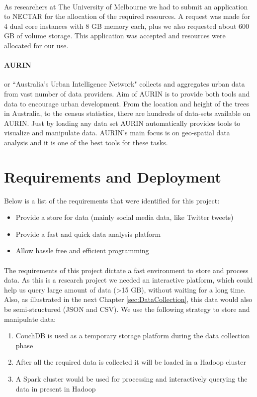 \documentclass[12pt]{report}
\theoremstyle{named}
\begin{document}
\paragraph{}
As researchers at The University of Melbourne we had to submit an application to NECTAR for the allocation of the required resources. A request was made for 4 dual core instances with 8 GB memory each, plus we also requested about 600 GB of volume storage. This application was accepted and resources were allocated for our use.

\paragraph{AURIN} or ``Australia’s Urban Intelligence Network" collects and aggregates urban data from vast number of data providers. Aim of AURIN is to provide both tools and data to encourage urban development. From the location and height of the trees in Australia, to the census statistics, there are hundreds of data-sets available on AURIN. Just by loading any data set AURIN automatically provides tools to visualize and manipulate data. AURIN's main focus is on geo-spatial data analysis and it is one of the best tools for these tasks.



\section{Requirements and Deployment}
Below is a list of the requirements that were identified for this project:
\begin{itemize}
  \item Provide a store for data (mainly social media data, like Twitter tweets) 
  \item Provide a fast and quick data analysis platform
  \item Allow hassle free and efficient programming
\end{itemize}

\paragraph{}
The requirements of this project dictate a fast environment to store and process data. As this is a research project we needed an interactive platform, which could help us query large amount of data (\textgreater15 GB), without waiting for a long time. Also, as illustrated in the next Chapter \ref{sec:DataCollection}, this data would also be semi-structured (JSON and CSV). We use the following strategy to store and manipulate data:
\begin{enumerate}
  \item CouchDB is used as a temporary storage platform during the data collection phase
  \item After all the required data is collected it will be loaded in a Hadoop cluster
  \item A Spark cluster would be used for processing and interactively querying the data in present in Hadoop
\end{enumerate}
\end{document}
